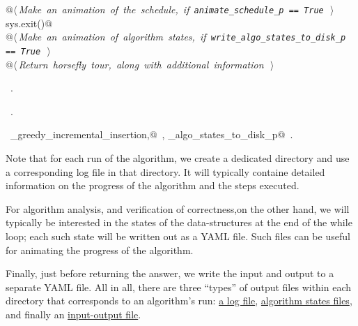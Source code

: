 \documentclass[11.5pt]{report}
\begin{document}
\begin{flushleft}
\begin{list}{}{}
\mbox{}\verb@      @\hbox{$\langle\,${\itshape Make an animation of the schedule, if \verb|animate_schedule_p == True|}\nobreak\ {\footnotesize {}}$\,\rangle$}\verb@@\\
\mbox{}\verb@      sys.exit()@\\
\mbox{}\verb@      @\hbox{$\langle\,${\itshape Make an animation of algorithm states, if \verb|write_algo_states_to_disk_p == True|}\nobreak\ {\footnotesize {}}$\,\rangle$}\verb@@\\
\mbox{}\verb@      @\hbox{$\langle\,${\itshape Return horsefly tour, along with additional information}\nobreak\ {\footnotesize {}}$\,\rangle$}\verb@@\\
\mbox{}\verb@@{\NWsep}
\end{list}
\vspace{-1.5ex}
\footnotesize
\begin{list}{}{\setlength{\itemsep}{-\parsep}\setlength{\itemindent}{-\leftmargin}}
\item \NWtxtMacroDefBy\ .
\item \NWtxtMacroRefIn\ .
\item \NWtxtIdentsDefed\nobreak\  \verb@algo_greedy_incremental_insertion,@\nobreak\ , \verb@write_algo_states_to_disk_p@\nobreak\ .
\item{}
\end{list}
\vspace{4ex}
\end{flushleft}


\vspace{-0.8cm}\newchunk Note that for each run of the algorithm, we create a dedicated directory and 
use a corresponding log file  in that directory. It will typically containe detailed 
information on the progress of the algorithm and the steps executed. 

For algorithm analysis, and verification of correctness,on the other hand, we will 
typically  be interested in the states of the data-structures at the end of 
the while loop; each such state will be written out as a YAML file. Such files can 
be useful for animating the progress of the algorithm. 

Finally, just before returning the answer, we write the input and output 
to a separate YAML file. All in all, there are three ``types'' of output files
within each directory that corresponds to an algorithm's run: 
\underline{a log file}, \underline{algorithm states files}, and finally 
an \underline{input-output file}. 
\end{document}

